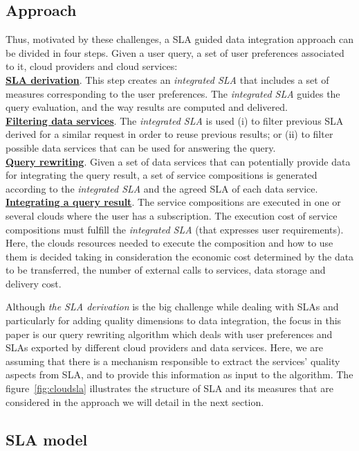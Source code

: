 \subsection{Approach}
Thus, motivated by these challenges, a SLA guided data integration approach can be divided in four steps. Given a user query, a set of user preferences associated to it, cloud providers and cloud services:
\\
\textbf{\underline{SLA derivation}}. This step creates an \textsl{integrated
SLA} that includes a set of measures corresponding to the user preferences. The \textsl{integrated SLA} guides the query evaluation, and the way results are computed and delivered. \\
\textbf{\underline{Filtering data services}}. The \textsl{integrated SLA} is used (i)
to filter previous SLA derived for a similar request in order to reuse previous results; or (ii) to filter possible data services that can be used for answering the query. \\
\textbf{\underline{Query rewriting}}. Given a set of data services that can
potentially provide data for integrating the query result, a set of service compositions is generated according to the \textsl{integrated SLA} and the agreed SLA of each data service. \\
\textbf{\underline{Integrating a query result}}. The service compositions are executed
in one or several clouds where the user has a subscription. The execution cost of service compositions must fulfill the \textsl{integrated SLA} (that expresses user requirements). Here, the clouds resources needed to execute the composition and how to use them is decided taking in consideration the economic cost determined by the data to be transferred, the number of external calls to services, data storage and delivery cost.

Although \textit{the SLA derivation} is the big challenge while dealing with
SLAs and particularly for adding quality dimensions to data integration, the
focus in this paper is our query rewriting algorithm which deals with user
preferences and SLAs exported by different cloud providers and data services.
Here, we are assuming that there is a mechanism responsible to extract the
services' quality aspects from SLA, and to provide this information as input to
the algorithm. The figure~\ref{fig:cloudsla} illustrates the structure of SLA
and its measures that are considered in the approach we will detail in the next
section.   

\subsection{SLA model}

